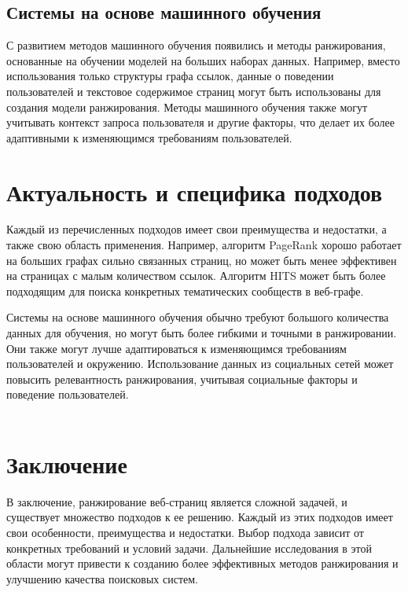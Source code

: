 \documentclass[a4paper]{article}
\begin{document}
	\subsection{Системы на основе машинного обучения}
	
	С развитием методов машинного обучения появились и методы ранжирования, основанные на обучении моделей на больших наборах данных. Например, вместо использования только структуры графа ссылок, данные о поведении пользователей и текстовое содержимое страниц могут быть использованы для создания модели ранжирования. Методы машинного обучения также могут учитывать контекст запроса пользователя и другие факторы, что делает их более адаптивными к изменяющимся требованиям пользователей.

	\section{Актуальность и специфика подходов}
	
	Каждый из перечисленных подходов имеет свои преимущества и недостатки, а также свою область применения. Например, алгоритм PageRank хорошо работает на больших графах сильно связанных страниц, но может быть менее эффективен на страницах с малым количеством ссылок. Алгоритм HITS может быть более подходящим для поиска конкретных тематических сообществ в веб-графе.
	
	Системы на основе машинного обучения обычно требуют большого количества данных для обучения, но могут быть более гибкими и точными в ранжировании. Они также могут лучше адаптироваться к изменяющимся требованиям пользователей и окружению. Использование данных из социальных сетей может повысить релевантность ранжирования, учитывая социальные факторы и поведение пользователей.
	\\
	\\
	\section{Заключение}
	
	В заключение, ранжирование веб-страниц является сложной задачей, и существует множество подходов к ее решению. Каждый из этих подходов имеет свои особенности, преимущества и недостатки. Выбор подхода зависит от конкретных требований и условий задачи. Дальнейшие исследования в этой области могут привести к созданию более эффективных методов ранжирования и улучшению качества поисковых систем.

\newpage
\end{document}
